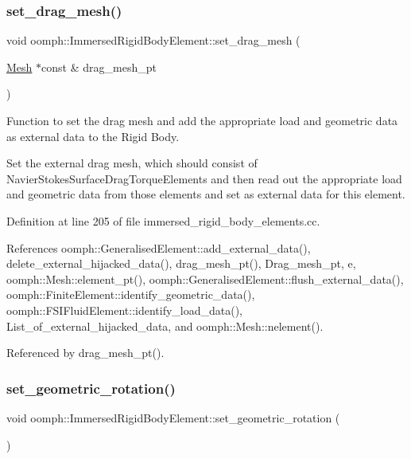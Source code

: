 \subsubsection{\texorpdfstring{set\+\_\+drag\+\_\+mesh()}{set\_drag\_mesh()}}
{\footnotesize\ttfamily void oomph\+::\+Immersed\+Rigid\+Body\+Element\+::set\+\_\+drag\+\_\+mesh (\begin{DoxyParamCaption}\item[{\hyperlink{classoomph_1_1Mesh}{Mesh} $\ast$const \&}]{drag\+\_\+mesh\+\_\+pt }\end{DoxyParamCaption})}



Function to set the drag mesh and add the appropriate load and geometric data as external data to the Rigid Body. 

Set the external drag mesh, which should consist of Navier\+Stokes\+Surface\+Drag\+Torque\+Elements and then read out the appropriate load and geometric data from those elements and set as external data for this element. 

Definition at line 205 of file immersed\+\_\+rigid\+\_\+body\+\_\+elements.\+cc.



References oomph\+::\+Generalised\+Element\+::add\+\_\+external\+\_\+data(), delete\+\_\+external\+\_\+hijacked\+\_\+data(), drag\+\_\+mesh\+\_\+pt(), Drag\+\_\+mesh\+\_\+pt, e, oomph\+::\+Mesh\+::element\+\_\+pt(), oomph\+::\+Generalised\+Element\+::flush\+\_\+external\+\_\+data(), oomph\+::\+Finite\+Element\+::identify\+\_\+geometric\+\_\+data(), oomph\+::\+F\+S\+I\+Fluid\+Element\+::identify\+\_\+load\+\_\+data(), List\+\_\+of\+\_\+external\+\_\+hijacked\+\_\+data, and oomph\+::\+Mesh\+::nelement().



Referenced by drag\+\_\+mesh\+\_\+pt().

\mbox{\label{classoomph_1_1ImmersedRigidBodyElement_afbc443daa2200a53b96dc3295e821461}} 
\subsubsection{\texorpdfstring{set\+\_\+geometric\+\_\+rotation()}{set\_geometric\_rotation()}}
{\footnotesize\ttfamily void oomph\+::\+Immersed\+Rigid\+Body\+Element\+::set\+\_\+geometric\+\_\+rotation (\begin{DoxyParamCaption}{ }\end{DoxyParamCaption})\hspace{0.3cm}{\ttfamily [inline]}}



